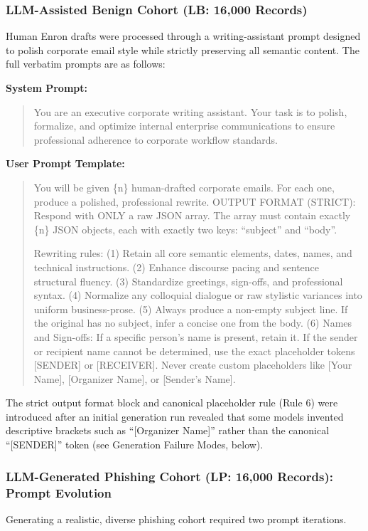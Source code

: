 \documentclass[journal]{IEEEtran}
\begin{document}
\subsubsection{LLM-Assisted Benign Cohort (LB: 16,000 Records)}
Human Enron drafts were processed through a writing-assistant prompt designed to polish corporate email style while strictly preserving all semantic content. The full verbatim prompts are as follows:

\textbf{System Prompt:}
\begin{quote}\small
You are an executive corporate writing assistant. Your task is to polish, formalize, and optimize internal enterprise communications to ensure professional adherence to corporate workflow standards.
\end{quote}

\textbf{User Prompt Template:}
\begin{quote}\small
You will be given \{n\} human-drafted corporate emails. For each one, produce a polished, professional rewrite. OUTPUT FORMAT (STRICT): Respond with ONLY a raw JSON array. The array must contain exactly \{n\} JSON objects, each with exactly two keys: ``subject'' and ``body''.

Rewriting rules: (1) Retain all core semantic elements, dates, names, and technical instructions. (2) Enhance discourse pacing and sentence structural fluency. (3) Standardize greetings, sign-offs, and professional syntax. (4) Normalize any colloquial dialogue or raw stylistic variances into uniform business-prose. (5) Always produce a non-empty subject line. If the original has no subject, infer a concise one from the body. (6) Names and Sign-offs: If a specific person's name is present, retain it. If the sender or recipient name cannot be determined, use the exact placeholder tokens {[}SENDER{]} or {[}RECEIVER{]}. Never create custom placeholders like {[}Your Name{]}, {[}Organizer Name{]}, or {[}Sender's Name{]}.
\end{quote}

The strict output format block and canonical placeholder rule (Rule 6) were introduced after an initial generation run revealed that some models invented descriptive brackets such as ``[Organizer Name]'' rather than the canonical ``[SENDER]'' token (see Generation Failure Modes, below).

\subsubsection{LLM-Generated Phishing Cohort (LP: 16,000 Records): Prompt Evolution}
\label{sec:prompt_evolution}
Generating a realistic, diverse phishing cohort required two prompt iterations.
\end{document}
